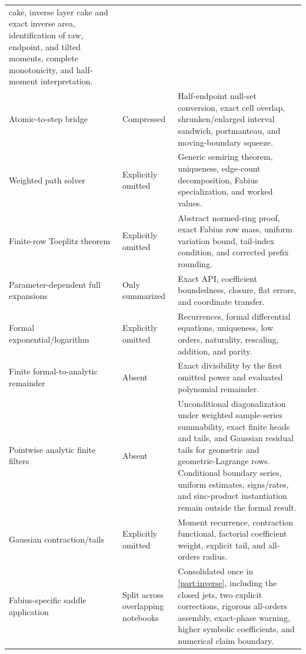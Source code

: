 \documentclass[11pt,oneside]{article}
\theoremstyle{definition}
\theoremstyle{remark}
\begin{document}
\begin{longtable}{@{}p{}p{}p{}@{}}
cake, inverse layer cake and exact inverse area, identification of raw, endpoint, and tilted
moments, complete monotonicity, and half-moment interpretation.\\
Atomic-to-step bridge & Compressed & Half-endpoint null-set conversion, exact cell overlap,
shrunken/enlarged interval sandwich, portmanteau, and moving-boundary squeeze.\\
Weighted path solver & Explicitly omitted & Generic semiring theorem, uniqueness, edge-count
decomposition, Fabius specialization, and worked values.\\
Finite-row Toeplitz theorem & Explicitly omitted & Abstract normed-ring proof, exact Fabius
row mass, uniform variation bound, tail-index condition, and corrected prefix rounding.\\
Parameter-dependent full expansions & Only summarized & Exact API, coefficient boundedness,
closure, flat errors, and coordinate transfer.\\
Formal exponential/logarithm & Explicitly omitted & Recurrences, formal differential equations,
uniqueness, low orders, naturality, rescaling, addition, and parity.\\
Finite formal-to-analytic remainder & Absent & Exact divisibility by the first omitted power
and evaluated polynomial remainder.\\
Pointwise analytic finite filters & Absent & Unconditional diagonalization under weighted
sample-series summability, exact finite heads and tails, and Gaussian residual tails for
geometric and geometric-Lagrange rows.  Conditional boundary series, uniform estimates,
signs/rates, and sinc-product instantiation remain outside the formal result.\\
Gaussian contraction/tails & Explicitly omitted & Moment recurrence, contraction functional,
factorial coefficient weight, explicit tail, and all-orders radius.\\
Fabius-specific saddle application & Split across overlapping notebooks & Consolidated once
in \cref{part:inverse}, including the closed jets, two explicit corrections, rigorous
all-orders assembly, exact-phase warning, higher symbolic coefficients, and numerical
claim boundary.\\
\bottomrule
\end{longtable}
\endgroup
\end{document}
